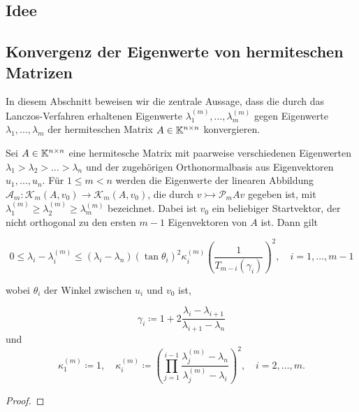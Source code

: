 \documentclass{article}
\begin{document}
\subsection{Idee}

\subsection{Konvergenz der Eigenwerte von hermiteschen Matrizen}

In diesem Abschnitt beweisen wir die zentrale Aussage, dass die durch das Lanczos-Verfahren erhaltenen Eigenwerte $\lambda_1^{(m)},\dots,\lambda_m^{(m)}$ gegen Eigenwerte $\lambda_1,\dots,\lambda_m$ der hermiteschen Matrix $A \in \mathbb{K}^{n \times n}$ konvergieren.



\begin{theorem}
	Sei $A \in \mathbb{K}^{n \times n}$ eine hermitesche Matrix mit paarweise verschiedenen Eigenwerten $\lambda_1 > \lambda_2 > \dots > \lambda_n$ und der zugehörigen Orthonormalbasis aus Eigenvektoren $u_1,\dots,u_n$. Für $1 \le m < n$ werden die Eigenwerte der linearen Abbildung $\mathcal{A}_m: \mathcal{K}_m(A,v_0)\rightarrow \mathcal{K}_m(A,v_0)$, die durch $v \rightarrowtail \mathcal{P}_mAv$ gegeben ist,  mit $\lambda_1^{(m)} \ge \lambda_2^{(m)} \ge \lambda_m^{(m)}$ bezeichnet. Dabei ist $v_0$ ein beliebiger Startvektor, der nicht orthogonal zu den ersten $m-1$ Eigenvektoren von $A$ ist. Dann gilt

	\begin{equation}
		\label{konvergenz Eigenwerte}
		0 \le \lambda_i - \lambda_i^{(m)} \le (\lambda_i -\lambda_n) (\tan\theta_i)^2 \kappa_i^{(m)} \left(\frac{1}{T_{m-i}(\gamma_i)}\right)^2, \quad i=1,\dots,m-1
	\end{equation}

	wobei $\theta_i$ der Winkel zwischen $u_i$ und $v_0$ ist,

	\begin{equation*}
		\gamma_i \coloneqq 1+2 \frac{\lambda_i-\lambda_{i+1}}{\lambda_{i+1} -\lambda_n}
	\end{equation*}
und
	\begin{equation*}
		\kappa_1^{(m)} \coloneqq 1, \quad \kappa_i^{(m)} \coloneqq \left(\prod_{j=1}^{i-1} \frac{\lambda_j^{(m)} - \lambda_n}{\lambda_j^{(m)} - \lambda_i}\right)^2, \quad i = 2,\dots,m.
	\end{equation*}

	\begin{proof}


\end{proof}
\end{theorem}
\end{document}
